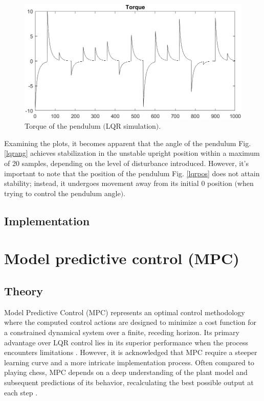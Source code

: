 \begin{figure}[!tbh]
	\centering
	\includegraphics[width=130mm]{obr/torquelqr.png}
	\caption{Torque of the pendulum $($LQR simulation$)$.}\label{lqrTorq}
\end{figure}

Examining the plots, it becomes apparent that the angle of the pendulum Fig. \ref{lqrang} achieves stabilization in the unstable upright position within a maximum of 20 samples, depending on the level of disturbance introduced. However, it's important to note that the position of the pendulum Fig. \ref{lqrpos} does not attain stability; instead, it undergoes movement away from its initial 0 position $($when trying to control the pendulum angle$)$.

\subsection{Implementation}

\newpage
\section{Model predictive control (MPC)}
\subsection{Theory}
Model Predictive Control (MPC) represents an optimal control methodology where the computed control actions are designed to minimize a cost function for a constrained dynamical system over a finite, receding horizon. Its primary advantage over LQR control lies in its superior performance when the process encounters limitations \cite{zaklPredRiad}. However, it is acknowledged that MPC require a steeper learning curve and a more intricate implementation process. Often compared to playing chess, MPC depends on a deep understanding of the plant model and subsequent predictions of its behavior, recalculating the best possible output at each step \cite{zaklPredRiad}\cite{mpcLecture}.

